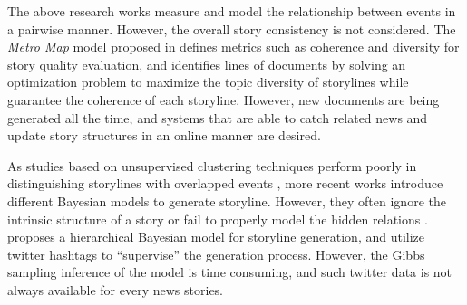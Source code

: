 The above research works measure and model the relationship between events in a pairwise manner. However, the overall story consistency is not considered.
The \textit{Metro Map} model proposed in \cite{shahaf2013information} defines metrics such as coherence and diversity for story quality evaluation, and identifies lines of documents by solving an optimization problem to maximize the topic diversity of storylines while guarantee the coherence of each storyline. 
However, new documents are being generated all the time, and systems that are able to catch related news and update story structures in an online manner are desired.

As studies based on unsupervised clustering techniques \cite{yan2011evolutionary} perform poorly in distinguishing storylines with overlapped events \cite{hua2016automatical},
more recent works introduce different Bayesian models to generate storyline. However, they often ignore the intrinsic structure of a story \cite{huang2013optimized} or fail to properly model the hidden relations \cite{zhou2015unsupervised}. \cite{hua2016automatical} proposes a hierarchical Bayesian model for storyline generation, and utilize twitter hashtags to ``supervise'' the generation process. However, the Gibbs sampling inference of the model is time consuming, and such twitter data is not always available for every news stories.
